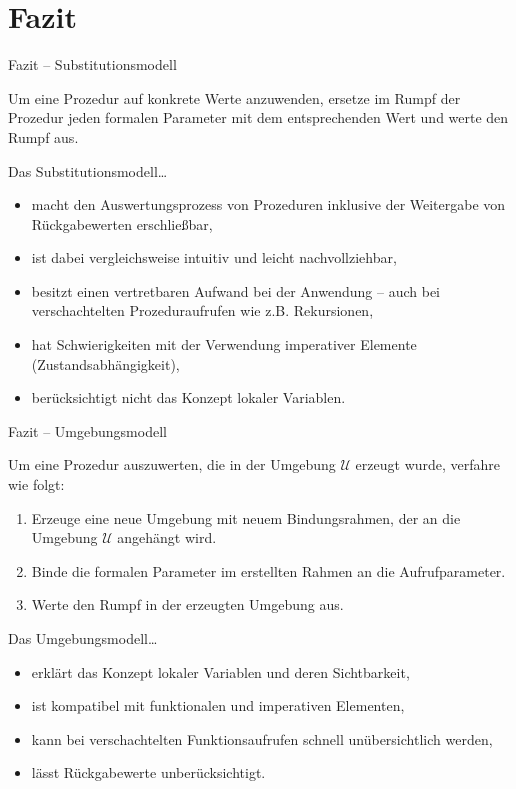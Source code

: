 \section{Fazit}
\begin{frame}[t,fragile]{Fazit -- Substitutionsmodell}
	\begin{mybox}
		Um eine Prozedur auf konkrete Werte anzuwenden, ersetze im Rumpf der Prozedur jeden formalen Parameter mit dem entsprechenden Wert und werte den Rumpf aus.
	\end{mybox}
	
	\vspace*{0.5cm}
	
	Das Substitutionsmodell\dots
	\begin{itemize}
		\item macht den Auswertungsprozess von Prozeduren inklusive der Weitergabe von Rückgabewerten erschließbar,
		\item ist dabei vergleichsweise intuitiv und leicht nachvollziehbar,
		\item besitzt einen vertretbaren Aufwand bei der Anwendung -- auch bei verschachtelten Prozeduraufrufen wie z.B. Rekursionen,
		\item hat Schwierigkeiten mit der Verwendung imperativer Elemente (Zustandsabhängigkeit),
		\item berücksichtigt nicht das Konzept lokaler Variablen.
	\end{itemize}
\end{frame}

\begin{frame}[t,fragile]{Fazit -- Umgebungsmodell}
	\begin{mybox}
		Um eine Prozedur auszuwerten, die in der Umgebung $\mathcal{U}$ erzeugt wurde, verfahre wie folgt:
		\begin{enumerate}
			\item Erzeuge eine neue Umgebung mit neuem Bindungsrahmen, der an die Umgebung $\mathcal{U}$ angehängt wird.
			\item Binde die formalen Parameter im erstellten Rahmen an die Aufrufparameter.
			\item Werte den Rumpf in der erzeugten Umgebung aus.
		\end{enumerate}
	\end{mybox}
	
	\vspace*{0.5cm}
	
	Das Umgebungsmodell\dots
	\begin{itemize}
		\item erklärt das Konzept lokaler Variablen und deren Sichtbarkeit,
		\item ist kompatibel mit funktionalen und imperativen Elementen,
		\item kann bei verschachtelten Funktionsaufrufen schnell unübersichtlich werden,
		\item lässt Rückgabewerte unberücksichtigt.
	\end{itemize}
\end{frame}

